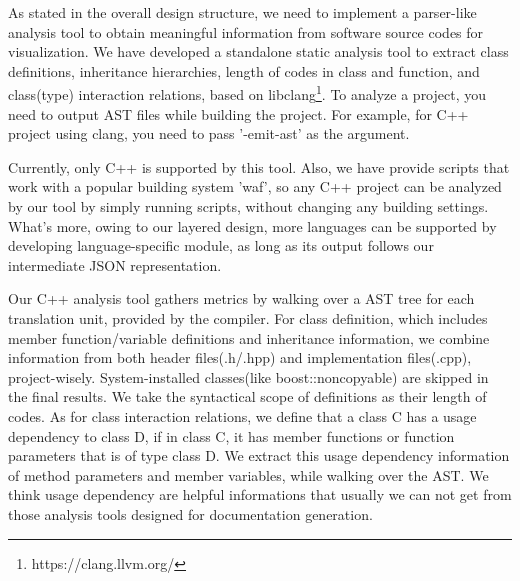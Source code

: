 \documentclass{sig-alternate}
\begin{document}
As stated in the overall design structure, we need to implement a parser-like analysis tool to obtain meaningful information from software source codes for visualization. We have developed a standalone static analysis tool to extract class definitions, inheritance hierarchies, length of codes in class and function, and class(type) interaction relations, based on libclang\footnote{https://clang.llvm.org/}. To analyze a project, you need to output AST files while building the project. For example, for C++ project using clang, you need to pass '-emit-ast' as the argument.

Currently, only C++ is supported by this tool. Also, we have provide scripts that work with a popular building system 'waf', so any C++ project can be analyzed by our tool by simply running scripts, without changing any building settings. What's more, owing to our layered design, more languages can be supported by developing language-specific module, as long as its output follows our intermediate JSON representation.

Our C++ analysis tool gathers metrics by walking over a AST tree for each translation unit, provided by the compiler. For class definition, which includes member function/variable definitions and inheritance information, we combine information from both header files(.h/.hpp) and implementation files(.cpp), project-wisely. System-installed classes(like boost::noncopyable) are skipped in the final results. We take the syntactical scope of definitions as their length of codes. As for class interaction relations, we define that a class C has a usage dependency to class D, if in class C, it has member functions or function parameters that is of type class D. We extract this usage dependency information of method parameters and member variables, while walking over the AST. We think usage dependency are helpful informations that usually we can not get from those analysis tools designed for documentation generation.
\end{document}
